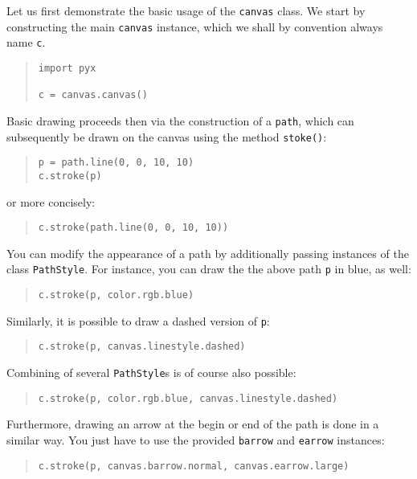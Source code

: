 Let us first demonstrate the basic usage of the \texttt{canvas} class.
We start by constructing the main \verb|canvas| instance, which we
shall by convention always name \verb|c|.
\begin{quote}
\begin{verbatim}
import pyx

c = canvas.canvas()
\end{verbatim}
\end{quote}
Basic drawing proceeds then via the construction of a \verb|path|, which 
can subsequently be drawn on the canvas using the method \verb|stoke()|:
\begin{quote}
\begin{verbatim}
p = path.line(0, 0, 10, 10)
c.stroke(p)
\end{verbatim}
\end{quote}
or more concisely:
\begin{quote}
\begin{verbatim}
c.stroke(path.line(0, 0, 10, 10))
\end{verbatim}
\end{quote}
You can modify the appearance of a path by additionally passing 
instances of the class \verb|PathStyle|. For instance, you can draw the 
the above path \verb|p| in blue, as well:
\begin{quote}
\begin{verbatim}
c.stroke(p, color.rgb.blue)
\end{verbatim}
\end{quote}
Similarly, it is possible to draw a dashed version of \verb|p|:
\begin{quote}
\begin{verbatim}
c.stroke(p, canvas.linestyle.dashed)
\end{verbatim}
\end{quote}
Combining of several \verb|PathStyle|s is of course also possible:
\begin{quote}
\begin{verbatim}
c.stroke(p, color.rgb.blue, canvas.linestyle.dashed)
\end{verbatim}
\end{quote}
Furthermore, drawing an arrow at the begin or end of the path is done
in a similar way. You just have to use the provided \verb|barrow| and 
\verb|earrow| instances:
\begin{quote}
\begin{verbatim}
c.stroke(p, canvas.barrow.normal, canvas.earrow.large)
\end{verbatim}
\end{quote}

